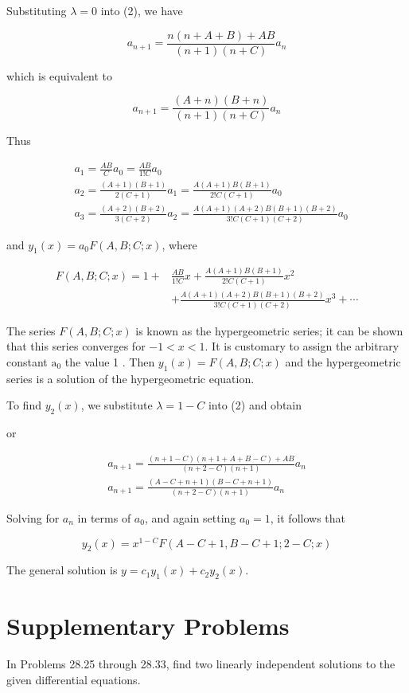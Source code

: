 \documentclass[10pt]{article}
\begin{document}
Substituting $\lambda=0$ into (2), we have

$$
a_{n+1}=\frac{n(n+A+B)+A B}{(n+1)(n+C)} a_{n}
$$

which is equivalent to

$$
a_{n+1}=\frac{(A+n)(B+n)}{(n+1)(n+C)} a_{n}
$$

Thus

$$
\begin{aligned}
& a_{1}=\frac{A B}{C} a_{0}=\frac{A B}{1 ! C} a_{0} \\
& a_{2}=\frac{(A+1)(B+1)}{2(C+1)} a_{1}=\frac{A(A+1) B(B+1)}{2 ! C(C+1)} a_{0} \\
& a_{3}=\frac{(A+2)(B+2)}{3(C+2)} a_{2}=\frac{A(A+1)(A+2) B(B+1)(B+2)}{3 ! C(C+1)(C+2)} a_{0}
\end{aligned}
$$

and $y_{1}(x)=a_{0} F(A, B ; C ; x)$, where

$$
\begin{aligned}
F(A, B ; C ; x)=1+ & \frac{A B}{1 ! C} x+\frac{A(A+1) B(B+1)}{2 ! C(C+1)} x^{2} \\
& +\frac{A(A+1)(A+2) B(B+1)(B+2)}{3 ! C(C+1)(C+2)} x^{3}+\cdots
\end{aligned}
$$

The series $F(A, B ; C ; x)$ is known as the hypergeometric series; it can be shown that this series converges for $-1<x<1$. It is customary to assign the arbitrary constant $\mathrm{a}_{0}$ the value 1 . Then $y_{1}(x)=F(A, B ; C ; x)$ and the hypergeometric series is a solution of the hypergeometric equation.

To find $y_{2}(x)$, we substitute $\lambda=1-C$ into (2) and obtain

or

$$
\begin{gathered}
a_{n+1}=\frac{(n+1-C)(n+1+A+B-C)+A B}{(n+2-C)(n+1)} a_{n} \\
a_{n+1}=\frac{(A-C+n+1)(B-C+n+1)}{(n+2-C)(n+1)} a_{n}
\end{gathered}
$$

Solving for $a_{n}$ in terms of $a_{0}$, and again setting $a_{0}=1$, it follows that

$$
y_{2}(x)=x^{1-C} F(A-C+1, B-C+1 ; 2-C ; x)
$$

The general solution is $y=c_{1} y_{1}(x)+c_{2} y_{2}(x)$.

\section*{Supplementary Problems}
In Problems 28.25 through 28.33, find two linearly independent solutions to the given differential equations.
\end{document}
